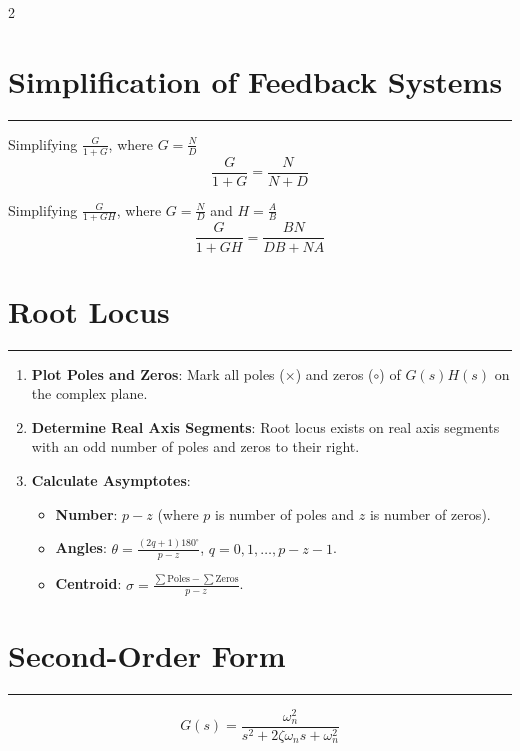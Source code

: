 \documentclass[letterpaper,10pt]{article}
\let\oldsection\section
\renewcommand{\section}[1]{%
\vspace{-1em}
  \oldsection{#1}%
  \par\vspace{-2em}%
  \noindent\rule{0.5\textwidth}{0.5pt}%
  \vspace{0em}%
}
\begin{document}
\begin{multicols}{2}
\section{Simplification of Feedback Systems}

Simplifying \( \frac{G}{1 + G} \), where \( G = \frac{N}{D} \)
\[
\frac{G}{1 + G} = \frac{N}{N + D}
\]

Simplifying \( \frac{G}{1 + GH} \), where \( G = \frac{N}{D} \) and \( H = \frac{A}{B} \)
\[
\frac{G}{1 + GH} = \frac{BN}{DB + NA}
\]
\vspace{-2.5em}
\section{Root Locus}

\begin{enumerate}[leftmargin=*]
    \item \textbf{Plot Poles and Zeros}: Mark all poles (\( \times \)) and zeros (\( \circ \)) of \( G(s)H(s) \) on the complex plane.
    
    \item \textbf{Determine Real Axis Segments}: Root locus exists on real axis segments with an odd number of poles and zeros to their right.
    
    \item \textbf{Calculate Asymptotes}:
    \begin{itemize}[leftmargin=*]
        \item \textbf{Number}: \( p - z \) (where \( p \) is number of poles and \( z \) is number of zeros).
        \item \textbf{Angles}: \( \theta = \frac{(2q + 1)180^\circ}{p - z} \), \( q = 0,1,\ldots,p-z-1 \).
        \item \textbf{Centroid}: \( \sigma = \frac{\sum \text{Poles} - \sum \text{Zeros}}{p - z} \).
    \end{itemize}
\end{enumerate}

\section{Second-Order Form}
\[
G(s) = \frac{\omega_n^2}{s^2 + 2\zeta\omega_n s + \omega_n^2}
\]

\end{multicols}
\end{document}
